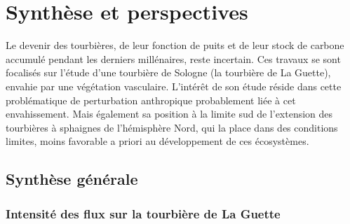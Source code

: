 \chapter*{Synthèse et perspectives}
\newpage



Le devenir des tourbières, de leur fonction de puits et de leur stock de carbone accumulé pendant les derniers millénaires, reste incertain.
Ces travaux se sont focalisés sur l'étude d'une tourbière de Sologne (la tourbière de La Guette), envahie par une végétation vasculaire.
L'intérêt de son étude réside dans cette problématique de perturbation anthropique probablement liée à cet envahissement.
Mais également sa position à la limite sud de l'extension des tourbières à sphaignes de l'hémisphère Nord, qui la place dans des conditions limites, moins favorable a priori au développement de ces écosystèmes.

\section*{Synthèse générale}

\subsection*{Intensité des flux sur la tourbière de La Guette}

